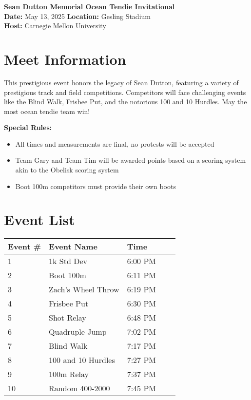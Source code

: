 \documentclass[10pt]{article}
\begin{document}
\begin{center}
    \LARGE \textbf{Sean Dutton Memorial Ocean Tendie Invitational} \\
    \large
    \vspace{0.5em}
    \textbf{Date:} May 13, 2025 \hspace{2cm} \textbf{Location:} Gesling Stadium \\
    \textbf{Host:} Carnegie Mellon University
\end{center}

\vspace{1em}

\section*{Meet Information}
This prestigious event honors the legacy of Sean Dutton, featuring a variety of prestigious track and field competitions. Competitors will face challenging events like the Blind Walk, Frisbee Put, and the notorious 100 and 10 Hurdles. May the most ocean tendie team win!
            
\textbf{Special Rules:}
\begin{itemize}
  \item All times and measurements are final, no protests will be accepted
  \item Team Gary and Team Tim will be awarded points based on a scoring system akin to the Obelisk scoring system
  \item Boot 100m competitors must provide their own boots
\end{itemize}


\vspace{1em}

\section*{Event List}

\begin{tabular}{@{}lllll@{}}
\toprule
\textbf{Event \#} & \textbf{Event Name} &  \textbf{Time} \\
\midrule
1 & 1k Std Dev & 6:00 PM \\
2 & Boot 100m & 6:11 PM \\
3 & Zach's Wheel Throw & 6:19 PM \\
4 & Frisbee Put & 6:30 PM \\
5 & Shot Relay & 6:48 PM \\
6 & Quadruple Jump & 7:02 PM \\
7 & Blind Walk & 7:17 PM \\
8 & 100 and 10 Hurdles & 7:27 PM \\
9 & 100m Relay & 7:37 PM \\
10 & Random 400-2000 & 7:45 PM \\
\bottomrule
\end{tabular}
\end{document}
